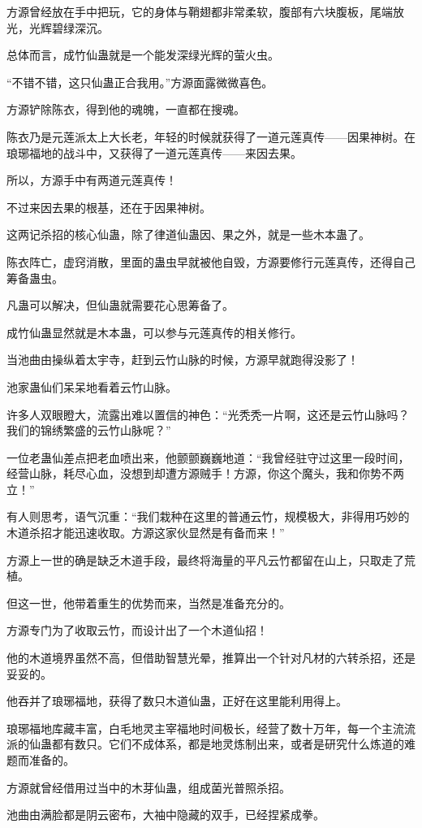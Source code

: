 \begin{this_body}
方源曾经放在手中把玩，它的身体与鞘翅都非常柔软，腹部有六块腹板，尾端放光，光辉碧绿深沉。

总体而言，成竹仙蛊就是一个能发深绿光辉的萤火虫。

“不错不错，这只仙蛊正合我用。”方源面露微微喜色。

方源铲除陈衣，得到他的魂魄，一直都在搜魂。

陈衣乃是元莲派太上大长老，年轻的时候就获得了一道元莲真传——因果神树。在琅琊福地的战斗中，又获得了一道元莲真传——来因去果。

所以，方源手中有两道元莲真传！

不过来因去果的根基，还在于因果神树。

这两记杀招的核心仙蛊，除了律道仙蛊因、果之外，就是一些木本蛊了。

陈衣阵亡，虚窍消散，里面的蛊虫早就被他自毁，方源要修行元莲真传，还得自己筹备蛊虫。

凡蛊可以解决，但仙蛊就需要花心思筹备了。

成竹仙蛊显然就是木本蛊，可以参与元莲真传的相关修行。

当池曲由操纵着太宇寺，赶到云竹山脉的时候，方源早就跑得没影了！

池家蛊仙们呆呆地看着云竹山脉。

许多人双眼瞪大，流露出难以置信的神色：“光秃秃一片啊，这还是云竹山脉吗？我们的锦绣繁盛的云竹山脉呢？”

一位老蛊仙差点把老血喷出来，他颤颤巍巍地道：“我曾经驻守过这里一段时间，经营山脉，耗尽心血，没想到却遭方源贼手！方源，你这个魔头，我和你势不两立！”

有人则思考，语气沉重：“我们栽种在这里的普通云竹，规模极大，非得用巧妙的木道杀招才能迅速收取。方源这家伙显然是有备而来！”

方源上一世的确是缺乏木道手段，最终将海量的平凡云竹都留在山上，只取走了荒植。

但这一世，他带着重生的优势而来，当然是准备充分的。

方源专门为了收取云竹，而设计出了一个木道仙招！

他的木道境界虽然不高，但借助智慧光晕，推算出一个针对凡材的六转杀招，还是妥妥的。

他吞并了琅琊福地，获得了数只木道仙蛊，正好在这里能利用得上。

琅琊福地库藏丰富，白毛地灵主宰福地时间极长，经营了数十万年，每一个主流流派的仙蛊都有数只。它们不成体系，都是地灵炼制出来，或者是研究什么炼道的难题而准备的。

方源就曾经借用过当中的木芽仙蛊，组成菌光普照杀招。

池曲由满脸都是阴云密布，大袖中隐藏的双手，已经捏紧成拳。


\end{this_body}
